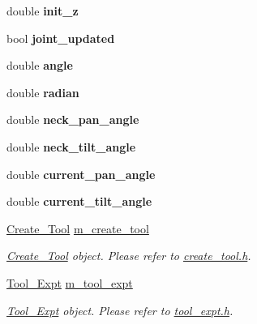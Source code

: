 \begin{DoxyCompactItemize}
double {\bfseries init\+\_\+z}
\item 
\mbox{\label{structManipulate_abcaccc1895a80de0d783cd4ddd81a342}} 
bool {\bfseries joint\+\_\+updated}
\item 
\mbox{\label{structManipulate_a8c7ac4122029e73731e486c57e1ba770}} 
double {\bfseries angle}
\item 
\mbox{\label{structManipulate_a23a9fc68451c629c4b12974fe3621925}} 
double {\bfseries radian}
\item 
\mbox{\label{structManipulate_a7672a6c53139018319933f155c6992d8}} 
double {\bfseries neck\+\_\+pan\+\_\+angle}
\item 
\mbox{\label{structManipulate_a00ca957deef210aa0a83f585f0c38c6d}} 
double {\bfseries neck\+\_\+tilt\+\_\+angle}
\item 
\mbox{\label{structManipulate_aa2fcae7cfa495ad78c449063af14476d}} 
double {\bfseries current\+\_\+pan\+\_\+angle}
\item 
\mbox{\label{structManipulate_a5bb6ce6456e4b07656fa307516334a60}} 
double {\bfseries current\+\_\+tilt\+\_\+angle}
\item 
\mbox{\label{structManipulate_aeec2ae3ce092861b38989e0ef0ca3f6f}} 
\hyperlink{classCreate__Tool}{Create\+\_\+\+Tool} \hyperlink{structManipulate_aeec2ae3ce092861b38989e0ef0ca3f6f}{m\+\_\+create\+\_\+tool}
\begin{DoxyCompactList}\small\item\em \hyperlink{classCreate__Tool}{Create\+\_\+\+Tool} object. Please refer to \hyperlink{create__tool_8h}{create\+\_\+tool.\+h}. \end{DoxyCompactList}\item 
\mbox{\label{structManipulate_a90bad2e2f4356d3d865b92c19dc34f44}} 
\hyperlink{classTool__Expt}{Tool\+\_\+\+Expt} \hyperlink{structManipulate_a90bad2e2f4356d3d865b92c19dc34f44}{m\+\_\+tool\+\_\+expt}
\begin{DoxyCompactList}\small\item\em \hyperlink{classTool__Expt}{Tool\+\_\+\+Expt} object. Please refer to \hyperlink{tool__expt_8h}{tool\+\_\+expt.\+h}. \end{DoxyCompactList}\item 

\end{DoxyCompactItemize}
